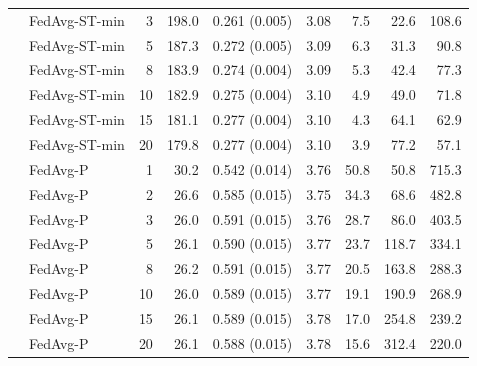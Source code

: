 \begin{longtable}{llrrrrrrr}
 & FedAvg-ST-min & 3 & 198.0 & 0.261 (0.005) & 3.08 & 7.5 & 22.6 & 108.6 \\
 & FedAvg-ST-min & 5 & 187.3 & 0.272 (0.005) & 3.09 & 6.3 & 31.3 & 90.8 \\
 & FedAvg-ST-min & 8 & 183.9 & 0.274 (0.004) & 3.09 & 5.3 & 42.4 & 77.3 \\
 & FedAvg-ST-min & 10 & 182.9 & 0.275 (0.004) & 3.10 & 4.9 & 49.0 & 71.8 \\
 & FedAvg-ST-min & 15 & 181.1 & 0.277 (0.004) & 3.10 & 4.3 & 64.1 & 62.9 \\
 & FedAvg-ST-min & 20 & 179.8 & 0.277 (0.004) & 3.10 & 3.9 & 77.2 & 57.1 \\
 & FedAvg-P & 1 & 30.2 & 0.542 (0.014) & 3.76 & 50.8 & 50.8 & 715.3 \\
 & FedAvg-P & 2 & 26.6 & 0.585 (0.015) & 3.75 & 34.3 & 68.6 & 482.8 \\
 & FedAvg-P & 3 & 26.0 & 0.591 (0.015) & 3.76 & 28.7 & 86.0 & 403.5 \\
 & FedAvg-P & 5 & 26.1 & 0.590 (0.015) & 3.77 & 23.7 & 118.7 & 334.1 \\
 & FedAvg-P & 8 & 26.2 & 0.591 (0.015) & 3.77 & 20.5 & 163.8 & 288.3 \\
 & FedAvg-P & 10 & 26.0 & 0.589 (0.015) & 3.77 & 19.1 & 190.9 & 268.9 \\
 & FedAvg-P & 15 & 26.1 & 0.589 (0.015) & 3.78 & 17.0 & 254.8 & 239.2 \\
 & FedAvg-P & 20 & 26.1 & 0.588 (0.015) & 3.78 & 15.6 & 312.4 & 220.0 \\
\end{longtable}\endgroup
